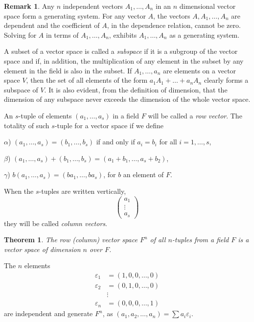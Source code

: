 \documentclass[10pt,leqno,a5paper]{book}
\newtheorem{theo}{Theorem}
\theoremstyle{definition}
\newtheorem*{rema}{Remark}
\def\eps{\varepsilon}
\begin{document}
\begin{rema}
Any $n$ independent vectors $A_1, \ldots, A_n$ in an $n$ dimensional vector space form a generating system.
For any vector $A$, the vectors $A, A_1, \ldots, A_n$ are dependent and the coefficient of $A$, in the dependence relation, cannot be zero.
Solving for $A$ in terms of $A_1, \ldots, A_n$, exhibits $A_1, \ldots, A_n$ as a generating system.
\end{rema}


A subset of a vector space is called a \emph{subspace} if it is a subgroup of the vector space and if, in addition, the multiplication of any element in the subset by any element in the field is also in the subset.
If $A_1, \ldots, a_n$ are elements on a vector space $V$, then the set of all elements of the form $a_1 A_1 + \ldots + a_n A_n$ clearly forms a subspace of $V$.
It is also evident, from the definition of dimension, that the dimension of any subspace never exceeds the dimension of the whole vector space.

An $s$-tuple of elements $(a_1, \ldots, a_s)$ in a field $F$ will be called a \emph{row vector}.
The totality of such $s$-tuple for a vector space if we define

$\alpha$)
$(a_1, \ldots, a_s) = (b_1, \ldots, b_s)$ if and only if $a_i = b_i$ for all $i = 1, \ldots, s$,

$\beta$)
$(a_1, \ldots, a_s) + (b_1, \ldots, b_s)
= (a_1 + b_1, \ldots, a_s + b_2)$,

$\gamma$)
$b (a_1, \ldots, a_s) = (ba_1, \ldots, ba_s)$, for $b$ an element of $F$.

When the $s$-tuples are written vertically,
\[
\begin{pmatrix}
a_1 \\ \vdots \\ a_s
\end{pmatrix}
\]
they will be called \emph{column vectors}.


\begin{theo}
\label{theo:th}
The row (column) vector space $F^n$ of all $n$-tuples from a field $F$ is a vector space of dimension $n$ over $F$.
\end{theo}

The $n$ elements
\begin{align*}
\eps_1 &= (1, 0, 0, \ldots, 0)
\\
\eps_2 &= (0, 1, 0, \ldots, 0)
\\
& \vdots
\\
\eps_n &= (0, 0, 0, \ldots, 1)
\end{align*}
are independent and generate $F^n$, as
$(a_1, a_2, \ldots, a_n) = \sum a_i \eps_i$.
\end{document}
